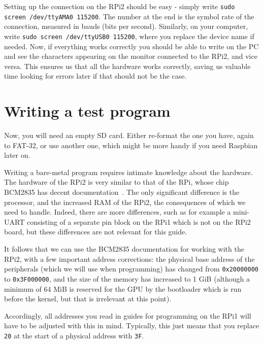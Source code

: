 \documentclass[a4paper,11pt,reqno]{amsart}
\begin{document}
Setting up the connection on the RPi2 should be easy - simply write \texttt{sudo screen /dev/ttyAMA0 115200}. The number at the end is the symbol rate of the connection, measured in bauds (bits per second). Similarly, on your computer, write \texttt{sudo screen /dev/ttyUSB0 115200}, where you replace the device name if needed. Now, if everything works correctly you should be able to write on the PC and see the characters appearing on the monitor connected to the RPi2, and vice versa. This ensures us that all the hardware works correctly, saving us valuable time looking for errors later if that should not be the case.

\section{Writing a test program}
Now, you will need an empty SD card. Either re-format the one you have, again to FAT-32, or use another one, which might be more handy if you need Raspbian later on.

Writing a bare-metal program requires intimate knowledge about the hardware. The hardware of the RPi2 is very similar to that of the RPi, whose chip BCM2835 has decent documentation~\cite{bcm2835}. The only significant difference is the processor, and the increased RAM of the RPi2, the consequences of which we need to handle. Indeed, there are more differences, such as for example a mini-UART consisting of a separate pin block on the RPi1 which is not on the RPi2 board, but these differences are not relevant for this guide.

It follows that we can use the BCM2835 documentation for working with the RPi2, with a few important address corrections: the physical base address of the peripherals (which we will use when programming) has changed from \texttt{0x20000000} to \texttt{0x3F000000}, and the size of the memory has increased to 1 GiB (although a minimum of 64 MiB is reserved for the GPU by the bootloader which is run before the kernel, but that is irrelevant at this point).

Accordingly, all addresses you read in guides for programming on the RPi1 will have to be adjusted with this in mind. Typically, this just means that you replace \texttt{20} at the start of a physical address with \texttt{3F}.
\end{document}
